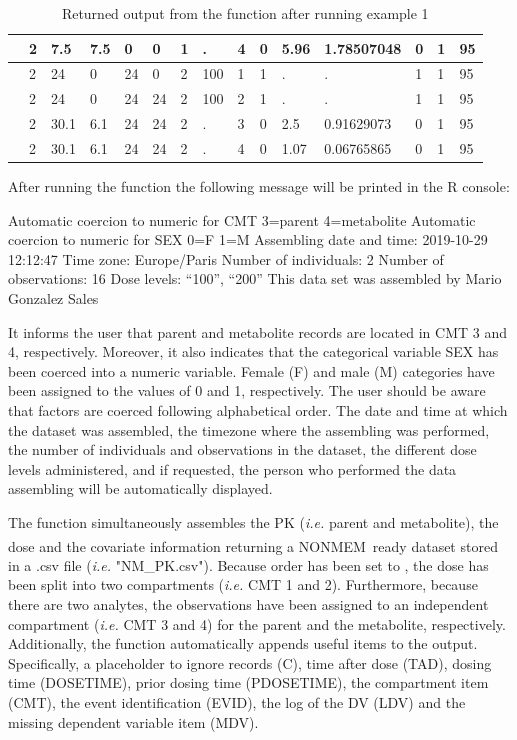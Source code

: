 \begin{table}[!ht]
{\begin{tabular}{|l|l|l|l|l|l|l|l|l|l|l|l|l|l|l|}
	\midrule
	&2	&7.5	&7.5&	0&	0&	1	&.	&4&	0&	5.96&	1.78507048	&0	&1	&95 \\
	\midrule
	&2	&24 &	0	&24&	0&	2&	100	&1	&1&	.&	.	&1	&1	& 95 \\
	\midrule
	&2	&24	&  0	&24&	24&	2&	100	&2	&1&	.&	.	&1	&1	& 95 \\
	\midrule
	&2	&30.1	&6.1&	24&	24&	2	&.	&3&	0&	2.5	&0.91629073	&0	&1	&95 \\
	\midrule
	&2	&30.1	&6.1&	24&	24&	2	&.	&4&	0&	1.07&	0.06765865	&0	&1&	95 \\
	\bottomrule
\end{tabular}
}
 \caption{Returned output from the  function after running example 1 \label{table:ex1}} 
\end{table}
    
After running the  function the following message will be printed in the R console: 

\begin{example}
Automatic coercion to numeric for CMT
3=parent
4=metabolite
Automatic coercion to numeric for SEX
0=F
1=M
Assembling date and time: 2019-10-29 12:12:47
Time zone: Europe/Paris
Number of individuals: 2
Number of observations: 16
Dose levels: “100”, “200”
This data set was assembled by Mario Gonzalez Sales
\end{example}

It informs the user that parent and metabolite records are located in CMT 3 and 4, respectively. Moreover, it also indicates that the categorical variable SEX has been coerced into a numeric variable. Female (F) and male (M) categories have been assigned to the values of 0 and 1, respectively. The user should be aware that factors are coerced following alphabetical order. The date and time at which the dataset was assembled, the timezone where the assembling was performed, the number of individuals and observations in the dataset, the different dose levels administered, and if requested, the person who performed the data assembling will be automatically displayed. 

The   function simultaneously assembles the PK (\textit{i.e.} parent and metabolite), the dose and the covariate information returning a NONMEM\textsuperscript{\textregistered}~ready dataset stored in a .csv file (\textit{i.e.} "NM\_PK.csv"). Because order has been set to , the dose has been split into two compartments (\textit{i.e.} CMT 1 and 2).  Furthermore, because there are two analytes, the observations have been assigned to an independent compartment (\textit{i.e.} CMT 3 and 4) for the parent and the metabolite, respectively. Additionally, the   function automatically appends useful items to the output. Specifically, a placeholder to ignore records (C), time after dose (TAD), dosing time (DOSETIME), prior dosing time (PDOSETIME), the compartment item (CMT), the event identification (EVID), the log of the DV (LDV) and the missing dependent variable item (MDV).  

